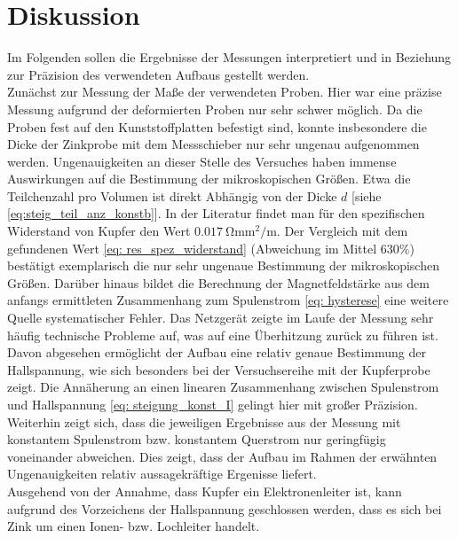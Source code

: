 \section{Diskussion}
Im Folgenden sollen die Ergebnisse der Messungen interpretiert und in Beziehung zur Präzision des verwendeten Aufbaus gestellt werden. \\
Zunächst zur Messung der Maße der verwendeten Proben. Hier war eine präzise Messung aufgrund der deformierten Proben nur sehr schwer möglich.
Da die Proben fest auf den Kunststoffplatten befestigt sind, konnte insbesondere die Dicke der Zinkprobe mit dem Messschieber nur sehr ungenau aufgenommen werden.
Ungenauigkeiten an dieser Stelle des Versuches haben immense Auswirkungen auf die Bestimmung der mikroskopischen Größen. Etwa die Teilchenzahl pro Volumen
ist direkt Abhängig von der Dicke $d$ [siehe \eqref{eq:steig_teil_anz_konstb}]. In der Literatur \cite{dem2} findet man für den spezifischen Widerstand von Kupfer den Wert $\SI{0.017}{\ohm \milli \meter^2 \per \meter}$. Der Vergleich %
mit dem gefundenen Wert \eqref{eq: res_spez_widerstand} (Abweichung im Mittel $630\%$) bestätigt exemplarisch die nur sehr ungenaue Bestimmung der mikroskopischen Größen. %
Darüber hinaus bildet die Berechnung der Magnetfeldstärke aus dem anfangs ermittleten Zusammenhang zum Spulenstrom \eqref{eq: hysterese} eine weitere Quelle systematischer
Fehler. Das Netzgerät zeigte im Laufe der Messung sehr häufig technische Probleme auf, was auf eine Überhitzung zurück zu führen ist. \\
Davon abgesehen ermöglicht der Aufbau eine relativ genaue Bestimmung der Hallspannung, wie sich besonders bei der Versuchsereihe mit der Kupferprobe zeigt. Die Annäherung
an einen linearen Zusammenhang zwischen Spulenstrom und Hallspannung \eqref{eq: steigung_konst_I} gelingt hier mit großer Präzision. Weiterhin zeigt sich, dass die jeweiligen
Ergebnisse aus der Messung mit konstantem Spulenstrom bzw. konstantem Querstrom nur geringfügig voneinander abweichen. Dies zeigt, dass der Aufbau im Rahmen der erwähnten
Ungenauigkeiten relativ aussagekräftige Ergenisse liefert.\\
Ausgehend von der Annahme, dass Kupfer ein Elektronenleiter ist,
kann aufgrund des Vorzeichens der Hallspannung geschlossen werden, dass es sich bei Zink um einen Ionen- bzw. Lochleiter handelt. \\
